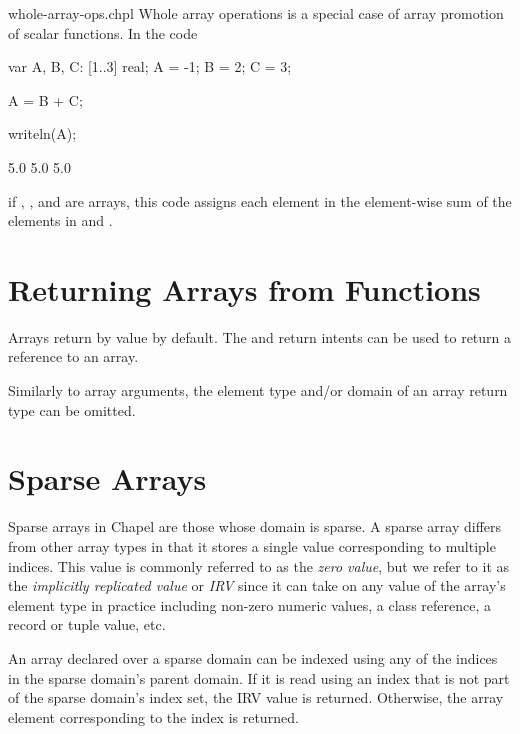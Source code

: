 \begin{chapelexample}{whole-array-ops.chpl}
Whole array operations is a special case of array promotion of scalar
functions.  In the code
\begin{chapelpre}
var A, B, C: [1..3] real;
A = -1;
B = 2;
C = 3;
\end{chapelpre}
\begin{chapel}
A = B + C;
\end{chapel}
\begin{chapelpost}
writeln(A);
\end{chapelpost}
\begin{chapeloutput}
5.0 5.0 5.0
\end{chapeloutput}
if , , and  are arrays, this code assigns each
element in  the element-wise sum of the elements in 
and .
\end{chapelexample}


\section{Returning Arrays from Functions}
\label{Returning_Arrays_from_Functions}

Arrays return by value by default. The  and 
return intents can be used to return a reference to an array.

Similarly to array arguments, the element type and/or domain of an array return
type can be omitted.


\section{Sparse Arrays}
\label{Sparse_Arrays}

Sparse arrays in Chapel are those whose domain is sparse.  A
sparse array differs from other array types in that it stores a single
value corresponding to multiple indices.  This value is commonly
referred to as the \emph{zero value}, but we refer to it as the
\emph{implicitly replicated value} or \emph{IRV} since it can take
on any value of the array's element type in practice including
non-zero numeric values, a class reference, a record or tuple value,
etc.

An array declared over a sparse domain can be indexed using any of the
indices in the sparse domain's parent domain.  If it is read using an
index that is not part of the sparse domain's index set, the IRV value
is returned.  Otherwise, the array element corresponding to the index
is returned.


